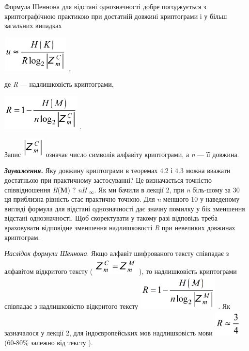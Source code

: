 Формула Шеннона для відстані однозначності добре погоджується з криптографічною
практикою при достатній довжині криптограми  і у більш загальних випадках

{\itshape
 \includegraphics[width=1.3335in,height=0.7189in]{crypt-img/crypt-img45.png} ,}

де \textit{R}\textit{ }--- надлишковість криптограми,  

{\centering
 \includegraphics[width=1.5626in,height=0.7118in]{crypt-img/crypt-img46.png} .
\par}

Запис 
\includegraphics[width=0.4374in,height=0.4063in]{crypt-img/crypt-img47.png} 
означає число символів алфавіту криптограми, а \textit{n} --- її довжина. 

\textbf{\textit{Зауваження}}\textbf{.} Яку довжину криптограми в теоремах 4.2 і
4.3 можна вважати достатньою при практичному застосуванні? Це визначається
точністю співвідношення  \textit{H}(\textbf{M})  ${?}$\textit{  }\textit{nH}
${{}_{{\infty }}}$. Як ми бачили в лекції 2, при \textit{n} біль-шому за 30 ця
приблизна рівність стає практично точною. Для \textit{n}\textit{ }меншого 10 у
наведеному вигляді формула для відстані однозначності дає значну помилку у бік
зменшення відстані однозначності. Щоб скоректувати у такому разі відповідь
треба враховувати відповідне зменшення надлишковості \textit{R} при невеликих
довжинах криптограм.

\textit{Наслідок формули Шеннона}. Якщо алфавіт шифрованого тексту співпадає з
алфавітом відкритого тексту (
\includegraphics[width=0.9016in,height=0.3339in]{crypt-img/crypt-img48.png} ),
то надлишковість криптограми співпадає з надлишковістю відкритого тексту
\includegraphics[width=1.6252in,height=0.7075in]{crypt-img/crypt-img49.png} . 
Як зазначалося у лекції 2, для iндоєвропейських мов надлишковість мови 
\includegraphics[width=0.5516in,height=0.5209in]{crypt-img/crypt-img50.png}   
(60-80\% залежно від тексту ).

